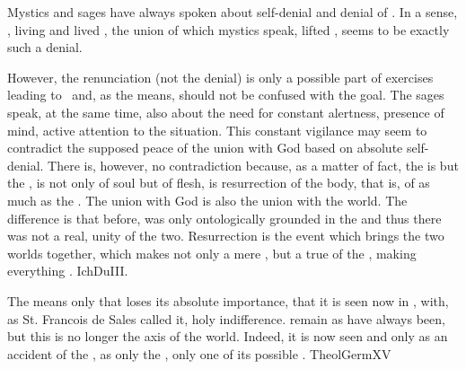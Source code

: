  Mystics and sages have always spoken about self-denial and denial of
.  In a sense, , living and lived ,
the union of which mystics speak, lifted , seems to be
exactly such a denial.

However, the renunciation (not the denial) is only a possible part of
 exercises leading to \yes\ and, as the means, should not be
confused with the goal.  The sages speak, at the same time, also about the need for
constant alertness, presence of mind, active attention to the 
situation.  This constant vigilance may seem to contradict the supposed peace of
the union with God based on absolute self-denial.  There is, however, no
contradiction because, as a matter of fact, the  is but the , is  not only of soul but of flesh, is resurrection of
the body, that is, of  as much as the .  The union
with God is also the union with the world.  The difference is that before,
 was only ontologically grounded in the  and thus
there was not a real,  unity of the two.  Resurrection is the
 event which brings the two worlds together, which makes
 not only a mere , but a true 
of the , making everything .
\citet{The strongest and deepest reality is where everything is included in the
  activity, the complete man without any reserve and the all-embracing God, the
  unitary self and the unlimited thou.}{IchDu}{III.}

\pa The  means only that  loses its
absolute importance, that it is seen now in  , with, as St.  Francois de Sales called it, {holy indifference}.
 remain  as  have always been, but this  is
no longer the axis of the world.  Indeed, it is now seen and 
only as an accident of the , as only the , only one of its
possible .  \citet{[A] man should so stand free, being quit of
  himself, that is, of his I, and Me, and Self, and Mine, and the like, that in
  all things, he should no more seek or regard himself, than if he did not
  exist, and should take as little account of himself as if he were not, and
  another had done all his works.  Likewise he should count all the creatures
  for nothing.}{TheolGerm}{XV}

